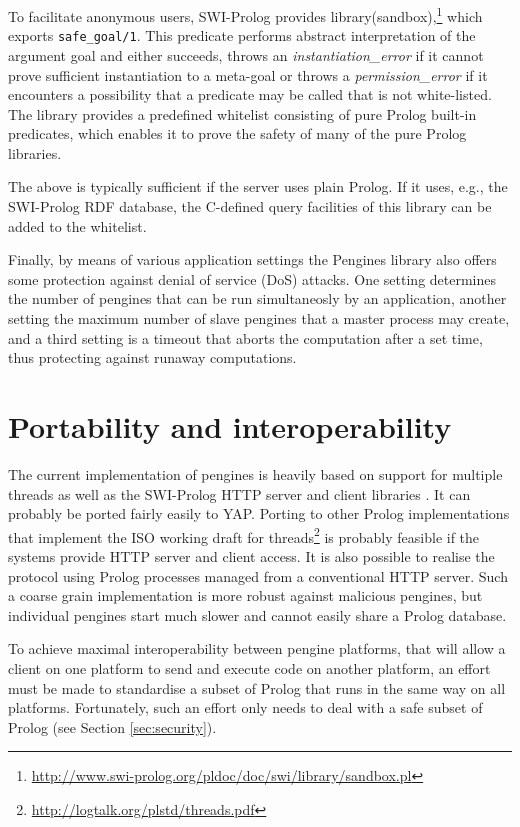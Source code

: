 \documentclass{new_tlp}
\newcommand{\reffont}{\tt}
\newcommand{\predref}[2]{\mbox{\reffont #1/#2}}
\begin{document}
To facilitate anonymous users, SWI-Prolog provides
library(sandbox),\footnote{\url{http://www.swi-prolog.org/pldoc/doc/swi/library/sandbox.pl}}
which exports \predref{safe\_goal}{1}. This predicate performs abstract
interpretation of the argument goal and either succeeds, throws an
\textit{instantiation\_error} if it cannot prove sufficient
instantiation to a meta-goal or throws a \textit{permission\_error} if
it encounters a possibility that a predicate may be called that is not
white-listed. The library provides a predefined whitelist consisting of
pure Prolog built-in predicates, which enables it to prove the safety of
many of the pure Prolog libraries.

The above is typically sufficient if the server uses plain Prolog. If it
uses, e.g., the SWI-Prolog RDF database, the C-defined query facilities
of this library can be added to the whitelist.

Finally, by means of various application settings the Pengines library also offers some protection against denial of service (DoS) attacks. One setting determines the number of pengines that can be run simultaneosly by an application, another setting the maximum number of slave pengines that a master process may create, and a third setting is a timeout that aborts the computation after a set time, thus protecting against runaway computations.


\section{Portability and interoperability}
\label{sec:portability}

The current implementation of pengines is heavily based on support for
multiple threads as well as the SWI-Prolog HTTP server and client
libraries \cite{wielemaker:tplp2008}. It can probably be ported fairly
easily to YAP. Porting to other Prolog implementations that implement
the ISO working draft for
threads\footnote{\url{http://logtalk.org/plstd/threads.pdf}} is probably
feasible if the systems provide HTTP server and client access. It is also
possible to realise the protocol using Prolog processes managed from a
conventional HTTP server. Such a coarse grain implementation is more
robust against malicious pengines, but individual pengines start much
slower and cannot easily share a Prolog database.

To achieve maximal interoperability between pengine platforms, that
will allow a client on one platform to send and execute code on another
platform, an effort must be made to standardise a subset of Prolog that
runs in the same way on all platforms. Fortunately, such an effort only
needs to deal with a safe subset of Prolog (see Section
\ref{sec:security}).
\end{document}
